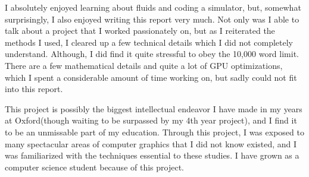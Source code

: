 I absolutely enjoyed learning about fluids and coding a simulator, but, somewhat surprisingly, I also enjoyed writing this report very much. Not only was I able to talk about a project that I worked passionately on, but as I reiterated the methods I used, I cleared up a few technical details which I did not completely understand. Although, I did find it quite stressful to obey the 10,000 word limit. There are a few mathematical details and quite a lot of GPU optimizations, which I spent a considerable amount of time working on, but sadly could not fit into this report.

This project is possibly the biggest intellectual endeavor I have made in my years at Oxford(though waiting to be surpassed by my 4th year project), and I find it to be an unmissable part of my education. Through this project, I was exposed to many spectacular areas of computer graphics that I did not know existed, and I was familiarized with the techniques essential to these studies. I have grown as a computer science student because of this project.